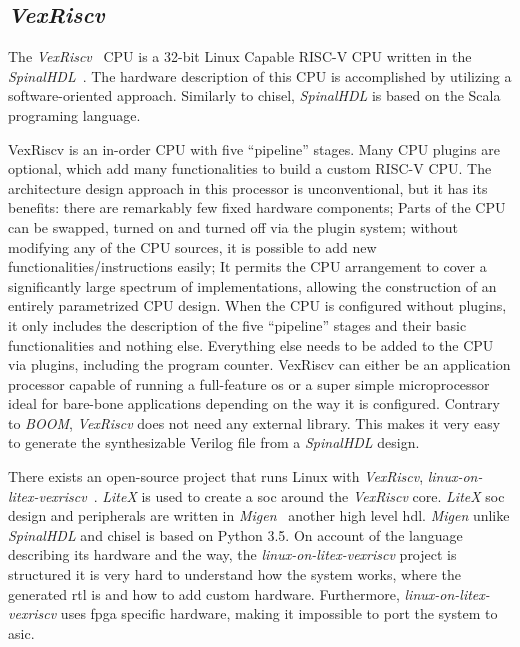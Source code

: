 \subsection{\textit{VexRiscv}}
The \textit{VexRiscv}~\cite{vexriscv} CPU is a 32-bit Linux Capable RISC-V CPU written in the \textit{SpinalHDL}~\cite{papon2017spinalhdl}. The hardware description of this CPU is accomplished by utilizing a software-oriented approach. Similarly to \acrshort{chisel}, \textit{SpinalHDL} is based on the Scala programing language.

VexRiscv is an in-order CPU with five \enquote{pipeline} stages. Many CPU plugins are optional, which add many functionalities to build a custom RISC-V CPU. The architecture design approach in this processor is unconventional, but it has its benefits: there are remarkably few fixed hardware components; Parts of the CPU can be swapped, turned on and turned off via the plugin system; without modifying any of the CPU sources, it is possible to add new functionalities/instructions easily; It permits the CPU arrangement to cover a significantly large spectrum of implementations, allowing the construction of an entirely parametrized CPU design. When the CPU is configured without plugins, it only includes the description of the five \enquote{pipeline} stages and their basic functionalities and nothing else. Everything else needs to be added to the CPU via plugins, including the program counter. VexRiscv can either be an application processor capable of running a full-feature \acrfull{os} or a super simple microprocessor ideal for bare-bone applications depending on the way it is configured. Contrary to \textit{BOOM}, \textit{VexRiscv} does not need any external library. This makes it very easy to generate the synthesizable Verilog file from a \textit{SpinalHDL} design.

There exists an open-source project that runs Linux with \textit{VexRiscv}, \textit{linux-on-litex-vexriscv}~\cite{litex_vexriscv}. \textit{LiteX} is used to create a \acrfull{soc} around the \textit{VexRiscv} core. \textit{LiteX} \acrshort{soc} design and peripherals are written in \textit{Migen}~\cite{bourdeauducq2012migen} another high level \acrshort{hdl}. \textit{Migen} unlike \textit{SpinalHDL} and  \acrshort{chisel} is based on Python 3.5. On account of the language describing its hardware and the way, the \textit{linux-on-litex-vexriscv} project is structured it is very hard to understand how the system works, where the generated \acrshort{rtl} is and how to add custom hardware. Furthermore, \textit{linux-on-litex-vexriscv} uses \acrshort{fpga} specific hardware, making it impossible to port the system to \acrshort{asic}.

